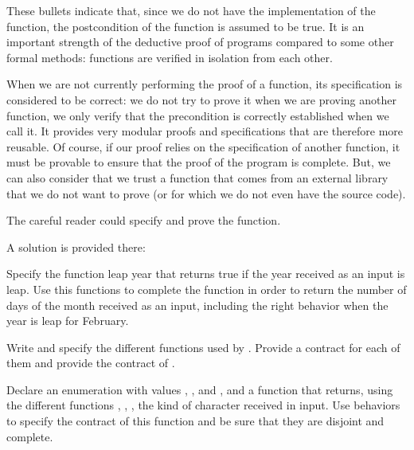 

These bullets indicate that, since we do not have the implementation
of the function, the postcondition of the function is assumed to be
true. It is an important strength of the deductive proof of programs
compared to some other formal methods: functions are verified in
isolation from each other.

When we are not currently performing the proof of a function, its
specification is considered to be correct: we do not try to prove it
when we are proving another function, we only verify that the
precondition is correctly established when we call it. It provides very
modular proofs and specifications that are therefore more reusable. Of
course, if our proof relies on the specification of another function, it
must be provable to ensure that the proof of the program is complete.
But, we can also consider that we trust a function that comes from an
external library that we do not want to prove (or for which we do not
even have the source code).

The careful reader could specify and prove the 
function.

A solution is provided there:








\label{l4:contract-modularity-ex-days-of-month}


Specify the function leap year that returns true if the year received
as an input is leap. Use this functions to complete the function
 in order to return the number of days of the
month received as an input, including the right behavior when the year
is leap for February.





\label{l4:contract-modularity-ex-alpha-num}


Write and specify the different functions used by
. Provide a contract for each of them and
provide the contract of .





Declare an enumeration with values , ,
 and , and a function
 that returns, using the different
functions , ,
, the kind of character received in input. Use
behaviors to specify the contract of this function and be sure that
they are disjoint and complete.




